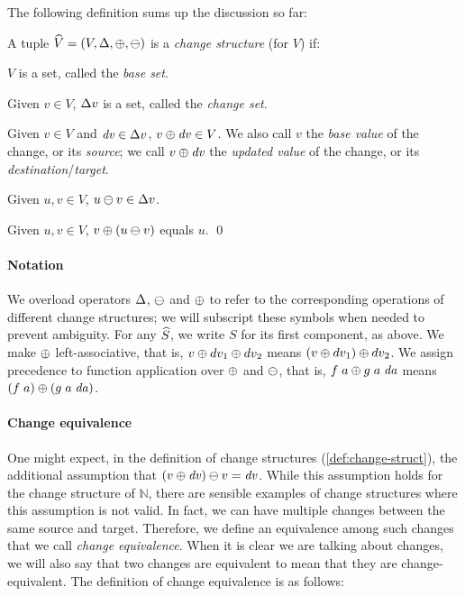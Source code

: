 The following definition sums up the discussion so far:

\begin{definition}
  \label{def:change-struct}
  A tuple $\ChangeStruct{V} = (V, \CHANGE,
  \UPDATE,
  \DIFF)$ is a \emph{change structure} (for $V$) if:

  \begin{subdefinition}
  \item $V$ is a set, called the \emph{base set}.
  \item Given $v \in V$, $\Change{v}$ is a set, called the \emph{change set}.
  \item Given $v \in V$ and $\D v \in \Change{v}$,
    $\Apply{\D v}{v} \in V$. We also call $v$ the \emph{base
      value} of the change, or its \emph{source}; we call
    $\Apply{\D v}{v}$ the \emph{updated value} of the change, or
    its \emph{destination}/\emph{target}.
    \label{def:update}
  \item Given $u, v \in V$, $\Diff{u}{v} \in \Change{v}$.
    \label{def:diff}
  \item Given $u, v \in V$, $\Apply{\Diff*{u}{v}}{v}$ equals $u$.
    \qed
    \label{def:update-diff}
  \end{subdefinition}
\end{definition}

\paragraph{Notation}
We overload operators $\CHANGE$, $\DIFF$ and $\UPDATE$ to refer
to the corresponding operations of different change structures;
we will subscript these symbols when needed to prevent ambiguity.
For any $\widehat{S}$, we write $S$ for its first component,
as above. We make $\UPDATE$ left-associative, that is,
$\Update{\Update{v}{dv_1}}{dv_2}$ means $\Update{\Update*{v}{dv_1}}{dv_2}$.
We assign precedence to function application over
$\UPDATE$ and $\DIFF$, that is, $\Update{\App{f}{a}}{\App{\App{g}{a}}{\D a}}$ means
$\Update{\App*{f}{a}}{\App*{\App{g}{a}}{\D a}}$.

\paragraph{Change equivalence}
One might expect, in the definition of change structures
(\cref{def:change-struct}), the additional assumption that
$\Diff{\Apply*{\D v}{v}}{v} = \D v$. While this assumption holds
for the change structure of $\mathbb{N}$, there are sensible
examples of change structures where this assumption is not valid.
In fact, we can have multiple changes between the same source and
target.  Therefore, we define an
equivalence among such changes that we call \emph{change
  equivalence}. When it is clear we are talking about changes, we
will also say that two changes are equivalent to mean that they
are change-equivalent. The definition of change equivalence is as
follows:

